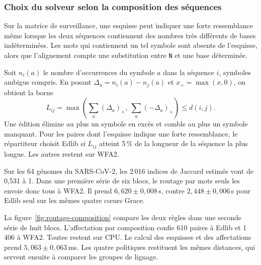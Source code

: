 \subsubsection{Choix du solveur selon la composition des séquences}\label{sec:routage-composition}
Sur la matrice de surveillance, une esquisse peut indiquer une forte ressemblance même lorsque les deux séquences contiennent des nombres très différents de bases indéterminées. Les mots qui contiennent un tel symbole sont absents de l’esquisse, alors que l’alignement compte une substitution entre \texttt{N} et une base déterminée.

Soit \(n_i(a)\) le nombre d’occurrences du symbole \(a\) dans la séquence \(i\), symboles ambigus compris. En posant \(\Delta_a=n_i(a)-n_j(a)\) et \(x_+=\max(x,0)\), on obtient la borne
\[
   L_{ij}=\max\!\left(\sum_a (\Delta_a)_+,\ \sum_a (-\Delta_a)_+\right)
   \le d(i,j).
\]
Une édition élimine au plus un symbole en excès et comble au plus un symbole manquant. Pour les paires dont l’esquisse indique une forte ressemblance, le répartiteur choisit Edlib si \(L_{ij}\) atteint 5\,\% de la longueur de la séquence la plus longue. Les autres restent sur WFA2.

Sur les 64 génomes du SARS-CoV-2, les 2\,016 indices de Jaccard estimés vont de 0,531 à 1. Dans une première série de six blocs, le routage par mots seuls les envoie donc tous à WFA2. Il prend \(6{,}620\pm0{,}008\)\,s, contre \(2{,}448\pm0{,}006\)\,s pour Edlib seul sur les mêmes quatre cœurs Grace.

La figure~\ref{fig:routage-composition} compare les deux règles dans une seconde série de huit blocs. L’affectation par composition confie 610 paires à Edlib et 1\,406 à WFA2. Toutes restent sur CPU. Le calcul des esquisses et des affectations prend \(5{,}063\pm0{,}063\)\,ms. Les quatre politiques restituent les mêmes distances, qui servent ensuite à comparer les groupes de lignage.

